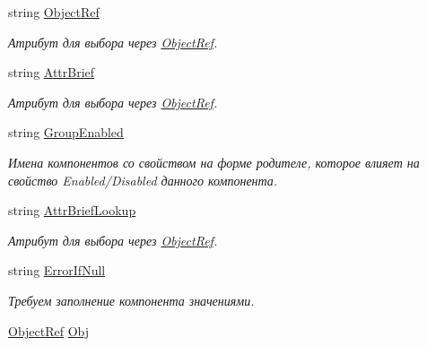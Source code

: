 \begin{DoxyCompactItemize}
string \mbox{\hyperlink{class_f_b_a_1_1_combo_box_f_b_a_a0df782ba3f7a2e10c0595a4f5c21e34b}{Object\+Ref}}
\begin{DoxyCompactList}\small\item\em Атрибут для выбора через \mbox{\hyperlink{class_f_b_a_1_1_object_ref}{Object\+Ref}}. \end{DoxyCompactList}\item 
string \mbox{\hyperlink{class_f_b_a_1_1_combo_box_f_b_a_a444901726d55937c248fc4ebceb9fd56}{Attr\+Brief}}
\begin{DoxyCompactList}\small\item\em Атрибут для выбора через \mbox{\hyperlink{class_f_b_a_1_1_object_ref}{Object\+Ref}}. \end{DoxyCompactList}\item 
string \mbox{\hyperlink{class_f_b_a_1_1_combo_box_f_b_a_a5616c2310a956cd82605a32e7dd35463}{Group\+Enabled}}
\begin{DoxyCompactList}\small\item\em Имена компонентов со свойством на форме родителе, которое влияет на свойство Enabled/\+Disabled данного компонента. \end{DoxyCompactList}\item 
string \mbox{\hyperlink{class_f_b_a_1_1_combo_box_f_b_a_ae767858bf456b75c5e5debf6817afa9b}{Attr\+Brief\+Lookup}}
\begin{DoxyCompactList}\small\item\em Атрибут для выбора через \mbox{\hyperlink{class_f_b_a_1_1_object_ref}{Object\+Ref}}. \end{DoxyCompactList}\item 
string \mbox{\hyperlink{class_f_b_a_1_1_combo_box_f_b_a_a79ff51a64368b78610280a5d3987ca53}{Error\+If\+Null}}
\begin{DoxyCompactList}\small\item\em Требуем заполнение компонента значениями. ~\newline
\end{DoxyCompactList}\item 
\mbox{\hyperlink{class_f_b_a_1_1_object_ref}{Object\+Ref}} \mbox{\hyperlink{class_f_b_a_1_1_combo_box_f_b_a_a4b8b35c54f082eb00921dfbe1a602eec}{Obj}}

\end{DoxyCompactItemize}
